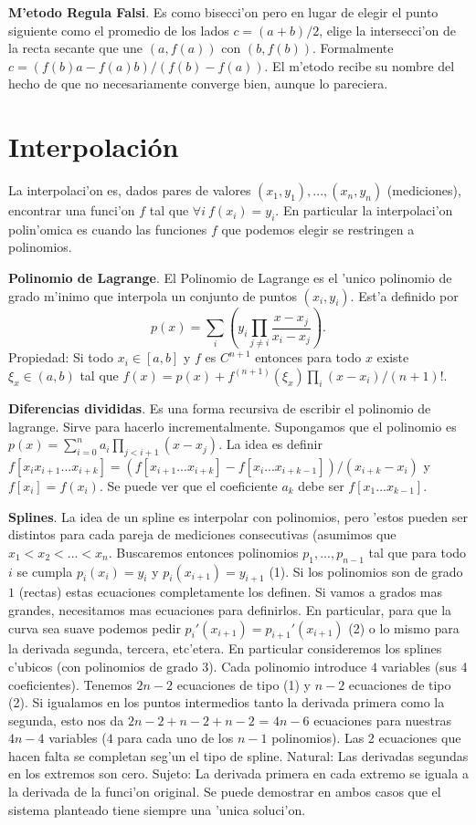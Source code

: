 \documentclass[a4paper,spanish]{article}
\begin{document}
\textbf{M'etodo Regula Falsi}. Es como bisecci'on pero en lugar de elegir el
punto siguiente como el promedio de los lados $c = (a+b)/2$, elige la
intersecci'on de la recta secante que une $(a,f(a))$ con $(b,f(b))$. 
Formalmente $c = (f(b)a - f(a)b)/(f(b)-f(a))$. El m'etodo recibe su nombre del
hecho de que no necesariamente converge bien, aunque lo pareciera.

\section{Interpolaci\'on}

La interpolaci'on es, dados pares de valores $(x_1,y_1),...,(x_n,y_n)$ 
(mediciones), encontrar una funci'on $f$ tal que $\forall i\ f(x_i) = y_i$. En
particular la interpolaci'on polin'omica es cuando las funciones $f$ que
podemos elegir se restringen a polinomios.

\textbf{Polinomio de Lagrange}. El Polinomio de Lagrange es el 'unico polinomio 
de grado m'inimo que interpola un conjunto de puntos $(x_i,y_i)$. Est'a
definido por
$$p(x)=\sum_i \left( y_i \prod_{j \neq i} \frac{x - x_j}{x_i - x_j} \right).$$
Propiedad: Si todo $x_i \in [a,b]$ y $f$ es $C^{n+1}$ entonces para todo $x$ 
existe $\xi_x \in (a,b)$ tal que 
$f(x) = p(x) + f^{(n+1)}(\xi_x) \prod_i (x-x_i) / (n+1)!$. 

\textbf{Diferencias divididas}. Es una forma recursiva de escribir el
polinomio de lagrange. Sirve para hacerlo incrementalmente. Supongamos que
el polinomio es $p(x) = \sum_{i=0}^n a_i \prod_{j < i+1} (x - x_j)$. La idea es
definir
$f[x_i x_{i+1} ... x_{i+k}] = (f[x_{i+1} ... x_{i+k}] - f[x_i ... x_{i+k-1}])
	/ (x_{i+k} - x_i)$ y $f[x_i] = f(x_i)$. Se puede ver que el coeficiente
$a_k$ debe ser $f[x_1 ... x_{k-1}]$.

\textbf{Splines}. La idea de un spline es interpolar con polinomios, pero 
'estos pueden ser distintos para cada pareja de mediciones consecutivas
(asumimos que $x_1 < x_2 < ... < x_n$. Buscaremos entonces polinomios
$p_1,...,p_{n-1}$ tal que para todo $i$ se cumpla $p_i(x_i) = y_i$ y 
$p_i(x_{i+1}) = y_{i+1}$ (1). Si los polinomios son de grado $1$ (rectas) 
estas ecuaciones completamente los definen. Si vamos a grados mas grandes,
necesitamos mas ecuaciones para definirlos. En particular, para que la curva
sea suave podemos pedir $p_i'(x_{i+1}) = p_{i+1}'(x_{i+1})$ (2) o lo mismo
para la derivada segunda, tercera, etc'etera. En particular consideremos los
splines c'ubicos (con polinomios de grado 3). Cada polinomio introduce $4$ 
variables (sus 4 coeficientes). Tenemos $2n-2$ ecuaciones de tipo (1) y 
$n-2$ ecuaciones de tipo (2). Si igualamos en los puntos intermedios tanto
la derivada primera como la segunda, esto nos da $2n-2 + n-2 + n-2$ = $4n-6$
ecuaciones para nuestras $4n-4$ variables ($4$ para cada uno de los $n-1$
polinomios). Las 2 ecuaciones que hacen falta se completan seg'un el tipo de
spline. Natural: Las derivadas segundas en los extremos son cero.
Sujeto: La derivada primera en cada extremo se iguala a la derivada de la
funci'on original. Se puede demostrar en ambos casos que el sistema planteado
tiene siempre una 'unica soluci'on.
\end{document}

